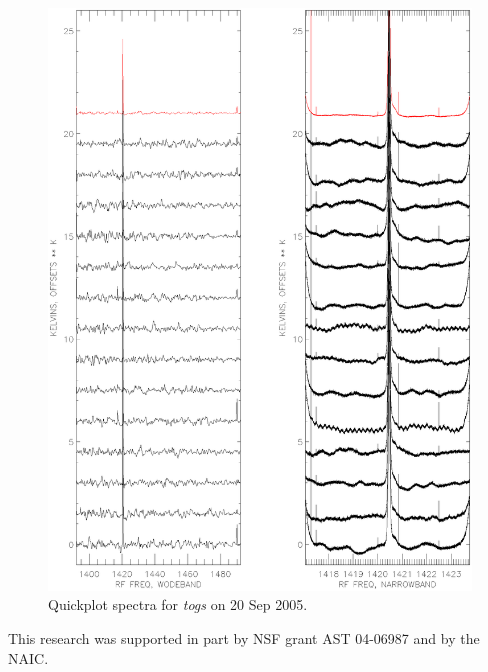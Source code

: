 \documentclass[psfig,preprint]{aastex}
\begin{document}
\begin{figure}[!p]
\begin{center}
\includegraphics[width=6in]{quickplot_920.togs.ps}   
\end{center}
\caption{Quickplot spectra for {\it togs} on 20 Sep 2005.\label{920}}
\end{figure}

\acknowledgements

        This research was supported in part by NSF grant AST 04-06987    
and by the NAIC.
\end{document}
